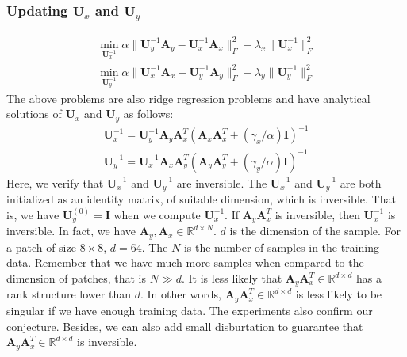 \documentclass[10pt,twocolumn,letterpaper]{article}
\begin{document}
\subsubsection{Updating $\mathbf{U}_{x}$ and $\mathbf{U}_{y}$}

\begin{equation}
\begin{split}
\min_{\mathbf{U}_{x}^{-1}}
\alpha
\|\mathbf{U}_{y}^{-1}\mathbf{A}_{y}-\mathbf{U}_{x}^{-1}\mathbf{A}_{x}\|_{F}^{2}
+
\lambda_{x}\|\mathbf{U}_{x}^{-1}\|_{F}^{2}
\\
\min_{\mathbf{U}_{y}^{-1}}
\alpha
\|\mathbf{U}_{x}^{-1}\mathbf{A}_{x}-\mathbf{U}_{y}^{-1}\mathbf{A}_{y}\|_{F}^{2}
+
\lambda_{y}\|\mathbf{U}_{y}^{-1}\|_{F}^{2}
\end{split}
\end{equation}
The above problems are also ridge regression problems and have analytical solutions of $\mathbf{U}_{x}$ and $\mathbf{U}_{y}$ as follows:
\begin{equation}
\begin{split}
\mathbf{U}_{x}^{-1} = \mathbf{U}_{y}^{-1}\mathbf{A}_{y}\mathbf{A}_{x}^{T}(\mathbf{A}_{x}\mathbf{A}_{x}^{T}+(\gamma_{x}/\alpha)\mathbf{I})^{-1}
\\
\mathbf{U}_{y}^{-1} = \mathbf{U}_{x}^{-1}\mathbf{A}_{x}\mathbf{A}_{y}^{T}(\mathbf{A}_{y}\mathbf{A}_{y}^{T}+(\gamma_{y}/\alpha)\mathbf{I})^{-1}
\end{split}
\end{equation}
Here, we verify that $\mathbf{U}_{x}^{-1}$ and $\mathbf{U}_{y}^{-1}$ are inversible. The $\mathbf{U}_{x}^{-1}$ and $\mathbf{U}_{y}^{-1}$ are both initialized as an identity matrix, of suitable dimension, which is inversible. That is, we have $\mathbf{U}_{y}^{(0)} = \mathbf{I}$ when we compute $\mathbf{U}_{x}^{-1}$. If $\mathbf{A}_{y}\mathbf{A}_{x}^{T}$ is inversible, then $\mathbf{U}_{x}^{-1}$ is inversible. In fact, we have $\mathbf{A}_{y},\mathbf{A}_{x}\in \mathbb{R}^{d\times N}$. $d$ is the dimension of the sample. For a patch of size $8\times8$, $d=64$. The $N$ is the number of samples in the training data. Remember that we have much more samples when compared to the dimension of patches, that is $N\gg d$. It is less likely that  $\mathbf{A}_{y}\mathbf{A}_{x}^{T}\in \mathbb{R}^{d\times d}$ has a rank structure lower than $d$. In other words,  $\mathbf{A}_{y}\mathbf{A}_{x}^{T}\in \mathbb{R}^{d\times d}$ is less likely to be singular if we have enough training data. The experiments also confirm our conjecture. Besides, we can also add small disburtation to guarantee that $\mathbf{A}_{y}\mathbf{A}_{x}^{T}\in \mathbb{R}^{d\times d}$ is inversible. 
\end{document}
